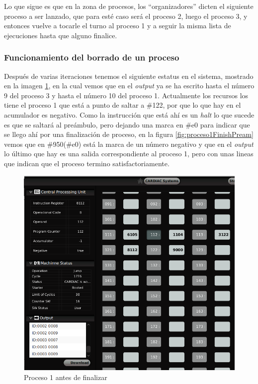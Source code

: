 \documentclass[letterpaper,12pt,oneside]{book}
\begin{document}
		
		Lo que sigue es que en la zona de procesos, los ``organizadores'' dicten el siguiente proceso a ser lanzado, que para esté caso será el proceso 2, luego
		el proceso 3, y entonces vuelve a tocarle el turno al proceso 1 y a seguir la misma lista de ejecuciones hasta que alguno finalice.
		
		
		
		\subsubsection{Funcionamiento del borrado de un proceso}
		
		Después de varias iteraciones tenemos el siguiente estatus en el sistema, mostrado en la imagen \ref{fig:proceso1BeforeFinish}, en la cual vemos que en el
		\textit{output} ya se ha escrito hasta el número 9 del proceso 3 y hasta el número 10 del proceso 1. Actualmente los recursos los tiene el proceso 1 que está a 
		punto de saltar a \#122, por que  lo que hay en el acumulador es negativo. Como la instrucción que está ahí es un \textit{halt} lo que sucede es que se saltará
		al preámbulo, pero dejando una marca en \#e0 para indicar que se llego ahí por una finalización de proceso, en la figura \ref{fig:proceso1FinishPream}
		vemos que en \#950(\#e0) está la marca de un número negativo y que en el \textit{output} lo último que hay es una salida correspondiente al
		proceso 1, pero con unas lineas que indican que el proceso termino satisfactoriamente.
		
		\begin{figure}[h]		
			\centering
			\includegraphics[scale=0.4]{media/CARDIACC/proceso1BeforeFinish_cutted.png}
			\caption{ Proceso 1 antes de finalizar }
			\label{fig:proceso1BeforeFinish}
		\end{figure}
		
\end{document}
